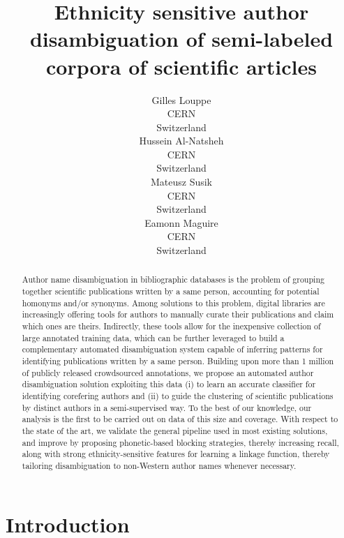 \documentclass{article}
\title{Ethnicity sensitive author disambiguation of semi-labeled corpora of scientific articles}
\author{Gilles Louppe\\
        CERN\\
        Switzerland\\
\And Hussein Al-Natsheh\\
        CERN\\
        Switzerland\\
\And Mateusz Susik\\
        CERN\\
        Switzerland\\
\And Eamonn Maguire\\
        CERN\\
        Switzerland}
\date{}
\begin{document}
\maketitle

\begin{abstract}

Author name disambiguation in bibliographic databases is the problem of
grouping together scientific publications written by a same person, accounting
for potential homonyms and/or synonyms. Among solutions to this problem,
digital libraries are increasingly offering tools for authors to manually
curate their publications and claim which ones are theirs. Indirectly, these
tools allow for the inexpensive collection of large annotated training data,
which can be further leveraged to build a complementary automated
disambiguation system capable of inferring patterns for identifying
publications written by a same person.  Building upon more than 1 million of
publicly released crowdsourced annotations, we propose an automated author
disambiguation solution exploiting this data (i) to learn an accurate
classifier for identifying corefering authors and (ii) to guide the clustering
of scientific publications by distinct authors in a semi-supervised way. To the
best of our knowledge, our analysis is the first to be carried out on data of
this size and coverage. With respect to the state of the art, we validate the
general pipeline used in most existing solutions, and improve by proposing
phonetic-based blocking strategies, thereby increasing recall, along with strong
ethnicity-sensitive features for learning a linkage function, thereby tailoring
disambiguation to non-Western author names whenever necessary.


\end{abstract}



\section{Introduction}
\label{introduction}

\end{document}
